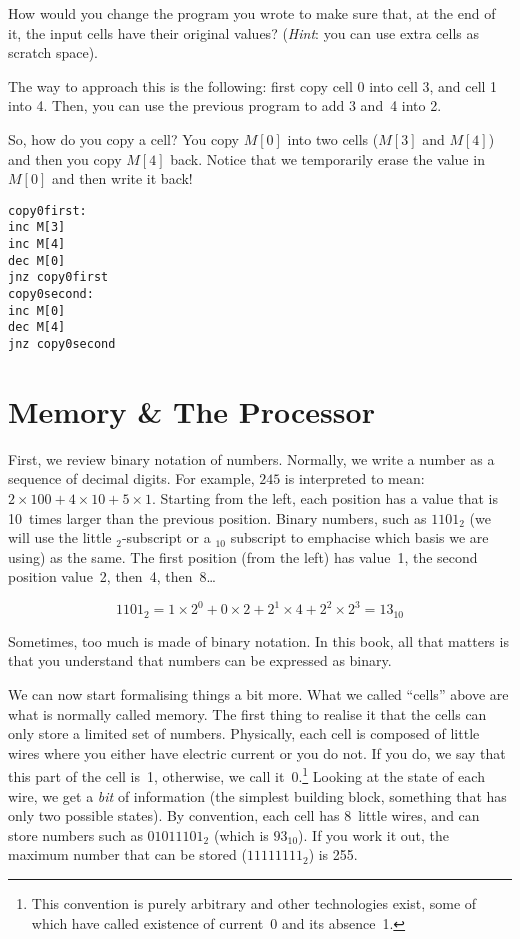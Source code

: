 \begin{exercise}
How would you change the program you wrote to make sure that, at the end of it,
the input cells have their original values? (\emph{Hint}: you can use extra
cells as scratch space).
\begin{solution}
The way to approach this is the following: first copy cell 0 into cell 3, and
cell 1 into 4. Then, you can use the previous program to add 3 and~4 into 2.

So, how do you copy a cell? You copy $M[0]$ into two cells ($M[3]$ and $M[4]$)
and then you copy $M[4]$ back. Notice that we temporarily erase the value in
$M[0]$ and then write it back!

\begin{verbatim}
copy0first:
inc M[3]
inc M[4]
dec M[0]
jnz copy0first
copy0second:
inc M[0]
dec M[4]
jnz copy0second
\end{verbatim}
\end{solution}
\end{exercise}

\section{Memory \& The Processor}

First, we review binary notation of numbers. Normally, we write a number as a
sequence of decimal digits. For example, $245$ is interpreted to mean: $2
\times 100 + 4 \times 10 + 5 \times 1$. Starting from the left, each position
has a value that is 10~times larger than the previous position. Binary numbers,
such as $1101_2$ (we will use the little $_2$-subscript or a $_{10}$ subscript
to emphacise which basis we are using) as the same. The first position (from
the left) has value~1, the second position value~2, then~4, then~8\ldots

\[
1101_2 = 1 \times 2^{0}  + 0 \times 2 + 2^1 \times 4 + 2^2 \times 2^3 = 13_{10}
\]

Sometimes, too much is made of binary notation. In this book, all that matters
is that you understand that numbers can be expressed as binary.

We can now start formalising things a bit more. What we called ``cells'' above
are what is normally called memory. The first thing to realise it that the
cells can only store a limited set of numbers. Physically, each cell is
composed of little wires where you either have electric current or you do not.
If you do, we say that this part of the cell is~1, otherwise, we call
it~0.\footnote{This convention is purely arbitrary and other technologies
exist, some of which have called existence of current~0 and its absence~1.}
Looking at the state of each wire, we get a \emph{bit} of information (the
simplest building block, something that has only two possible states). By
convention, each cell has 8~little wires, and can store numbers such as
$01011101_2$ (which is $93_{10}$). If you work it out, the maximum number that
can be stored ($11111111_2$) is 255.

